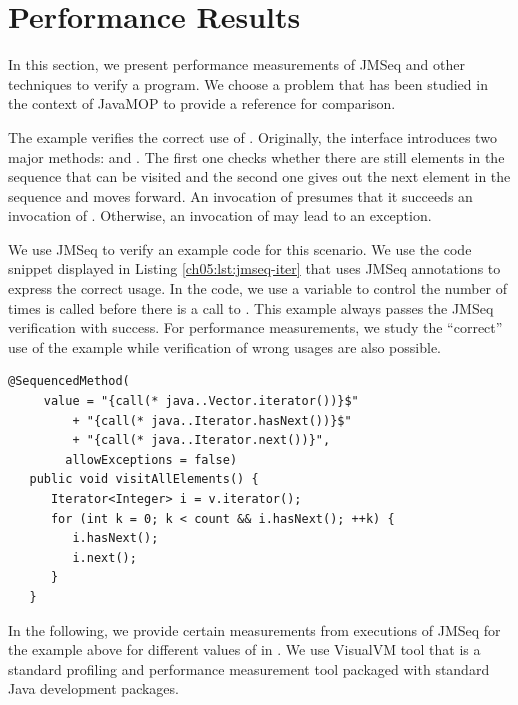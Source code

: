 \section{Performance Results} \label{ch05:sec:results}

In this section, we present performance measurements of JMSeq and other techniques to verify a program.
We choose a problem that has been studied in the context of JavaMOP \cite{chen_rosu_jmop} to provide a reference for comparison.

The example verifies the correct use of .
Originally, the interface introduces two major methods:  and . 
The first one checks whether there are still elements in the sequence that can be visited and the second one gives out the next element in the sequence and moves forward.
An invocation of  presumes that it succeeds an invocation of .
Otherwise, an invocation of  may lead to an exception.

We use JMSeq to verify an example code for this scenario. 
We use the code snippet displayed in Listing \ref{ch05:lst:jmseq-iter} that uses JMSeq annotations to express the correct usage. 
In the code, we use a variable  to control the number of times  is called before there is a call to . 
This example always passes the JMSeq verification with success. 
For performance measurements, we study the ``correct'' use of the example while verification of wrong usages are also possible. 
\lstset{language=Java}
\begin{lstlisting}[label=ch05:lst:jmseq-iter, caption=Iterator usage with
JMSeq Annotations]
   @SequencedMethod(
     value = "{call(* java..Vector.iterator())}$"
         + "{call(* java..Iterator.hasNext())}$"
         + "{call(* java..Iterator.next())}", 
        allowExceptions = false)
   public void visitAllElements() {
      Iterator<Integer> i = v.iterator();
      for (int k = 0; k < count && i.hasNext(); ++k) {
         i.hasNext();
         i.next();
      }
   }
\end{lstlisting}

In the following, we provide certain measurements from executions of JMSeq for the example above for different values of  in . 
We use VisualVM tool that is a standard profiling and performance measurement tool packaged with standard Java development packages.

